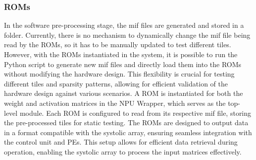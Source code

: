 \documentclass[12pt, a4paper, ukenglish]{article}
\begin{document}
    \subsubsection{ROMs}
    
    In the software pre-processing stage, the mif files are generated and stored in a folder. Currently, there is no mechanism to dynamically change the mif file being read by the ROMs, so it has to be manually updated to test different tiles. However, with the ROMs instantiated in the system, it is possible to run the Python script to generate new mif files and directly load them into the ROMs without modifying the hardware design. This flexibility is crucial for testing different tiles and sparsity patterns, allowing for efficient validation of the hardware design against various scenarios.
    A ROM is instantiated for both the weight and activation matrices in the NPU Wrapper, which serves as the top-level module. Each ROM is configured to read from its respective mif file, storing the pre-processed tiles for static testing. The ROMs are designed to output data in a format compatible with the systolic array, ensuring seamless integration with the control unit and PEs. This setup allows for efficient data retrieval during operation, enabling the systolic array to process the input matrices effectively.
\end{document}
